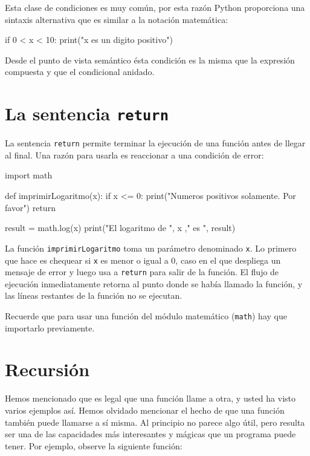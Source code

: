 Esta clase de condiciones es muy común, por esta razón Python proporciona
una sintaxis alternativa que es similar a la notación matemática:
\begin{pythoncode}
if 0 < x < 10:
  print("x es un digito positivo")
\end{pythoncode}

Desde el punto de vista semántico ésta condición es la misma que la
expresión compuesta y que el condicional anidado.

\section{La sentencia \texttt{return} }

 

La sentencia \texttt{return} permite terminar la ejecución de una
función antes de llegar al final. Una razón para usarla es reaccionar
a una condición de error:

\begin{pythoncode}
import math

def imprimirLogaritmo(x):
  if x <= 0:
    print("Numeros positivos solamente. Por favor")
    return

  result = math.log(x)
  print("El logaritmo de ",  x ," es ", result)
\end{pythoncode}

La función \texttt{imprimirLogaritmo} toma un parámetro denominado
\texttt{x}. Lo primero que hace es chequear si \texttt{x} es menor
o igual a 0, caso en el que despliega un mensaje de error y luego
usa a \texttt{return} para salir de la función. El flujo de ejecución
inmediatamente retorna al punto donde se había llamado la función,
y las líneas restantes de la función no se ejecutan.

Recuerde que para usar una función del módulo matemático (\texttt{math}) hay
que importarlo previamente.

\section{Recursión}

\label{recursion} 

Hemos mencionado que es legal que una función llame a otra, y usted
ha visto varios ejemplos así. Hemos olvidado mencionar el hecho de
que una función también puede llamarse a sí misma. Al principio no
parece algo útil, pero resulta ser una de las capacidades más interesantes
y mágicas que un programa puede tener. Por ejemplo, observe la siguiente
función:

